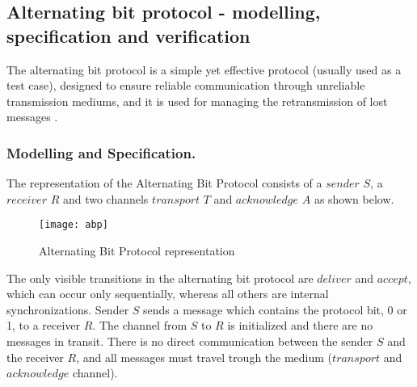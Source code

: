 \subsection{Alternating bit protocol - modelling, specification and verification}

The alternating bit protocol is a simple yet effective protocol (usually used as a test case), designed to ensure reliable communication through unreliable transmission mediums, and it is used for managing the retransmission of lost messages \cite{ReactiveSystems}\cite{Kulick}.

\subsubsection{Modelling and Specification.}
The representation of the Alternating Bit Protocol consists of a $sender$ $S$, a $receiver$ $R$ and two channels $transport$ $T$ and $acknowledge$ $A$ as shown below. 

\begin{figure}[h]
\centering
\texttt{[image: abp]}
\caption{Alternating Bit Protocol representation}
\label{fig:abp}
\end{figure}

The only visible transitions in the alternating bit protocol are $deliver$ and $accept$, which can occur only sequentially, whereas all others are internal synchronizations. Sender $S$ sends a message which contains the protocol bit, 0 or 1, to a receiver $R$. The channel from $S$ to $R$ is initialized and there are no messages in transit. There is no direct communication between the sender $S$ and the receiver $R$, and all messages must travel trough the medium ($transport$ and $acknowledge$ channel). 

